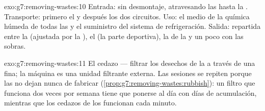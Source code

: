 \begin{solution}{exo:g7:removing-wastes:10}
Entrada: sin desmontaje, atravesando las  hasta la .
Transporte: primero el  y después los dos circuitos. Uso: el
medio de la química húmeda de todas las  y el suministro del
sistema de refrigeración. Salida: repartida entre la  (ajustada
por la ), el  (la parte deportiva), la  de la
 y un poco con las sobras.
\end{solution}

\begin{solution}{exo:g7:removing-wastes:11}
El cedazo --- filtrar los desechos de la  a través de una
 fina; la máquina es una unidad filtrante externa. Las sesiones
se repiten porque las  no dejan nunca de fabricar 
(\cref{prop:g7:removing-wastes:rubbish}): un filtro que funciona dos
veces por semana tiene que ponerse al día con días de acumulación,
mientras que los cedazos de los  funcionan cada minuto.
\end{solution}

